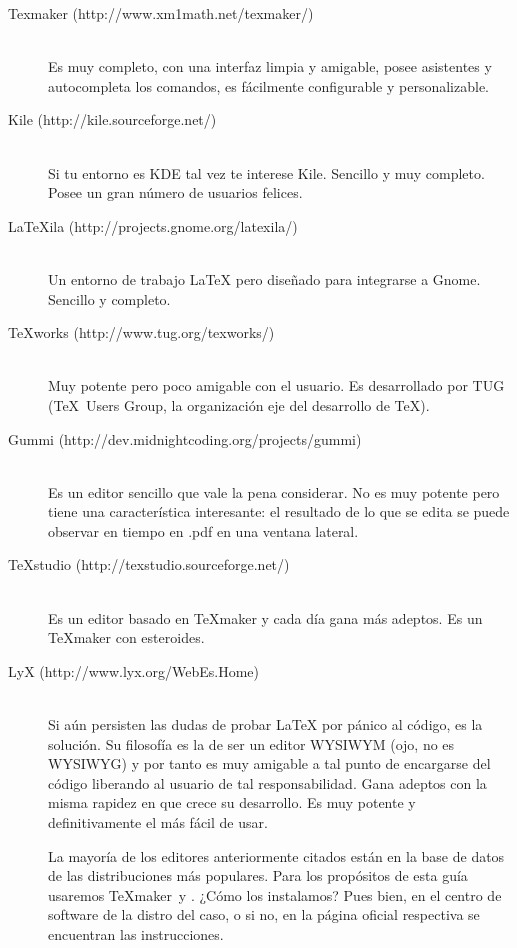 		\begin{description}
			\item[Texmaker (http://www.xm1math.net/texmaker/)] \hfill \\
			Es muy completo, con una interfaz limpia y amigable, posee asistentes y autocompleta los comandos, es fácilmente configurable y personalizable.
			\item[Kile (http://kile.sourceforge.net/)] \hfill \\
			Si tu entorno es KDE tal vez te interese Kile. Sencillo y muy completo. Posee un gran número de usuarios felices.
			\item[LaTeXila (http://projects.gnome.org/latexila/)] \hfill \\
			Un entorno de trabajo LaTeX pero diseñado para integrarse a Gnome. Sencillo y completo.
			\item[TeXworks (http://www.tug.org/texworks/)] \hfill \\
			Muy potente pero poco amigable con el usuario. Es desarrollado por TUG (\TeX\ Users Group, la organización eje del desarrollo de \TeX).
			\item[Gummi (http://dev.midnightcoding.org/projects/gummi)] \hfill \\
			Es un editor sencillo que vale la pena considerar. No es muy potente pero tiene una característica interesante: el resultado de lo que se edita se puede observar en tiempo en .pdf en una ventana lateral.
			\item[TeXstudio (http://texstudio.sourceforge.net/)] \hfill \\
			Es un editor basado en TeXmaker y cada día gana más adeptos. Es un TeXmaker con esteroides.
			\item[LyX (http://www.lyx.org/WebEs.Home)] \hfill \\
			Si aún persisten las dudas de probar LaTeX por pánico al código, \LyX es la solución. Su filosofía es la de ser un editor WYSIWYM (ojo, no es WYSIWYG) y por tanto es muy amigable a tal punto de encargarse del código liberando al usuario de tal responsabilidad. Gana adeptos con la misma rapidez en que crece su desarrollo. Es muy potente y definitivamente el más fácil de usar.
			
			La mayoría de los editores anteriormente citados están en la base de datos de las distribuciones más populares.
			Para los propósitos de esta guía usaremos \TeX maker\ y \LyX.
			¿Cómo los instalamos? Pues bien, en el centro de software de la distro del caso, o si no, en la página oficial respectiva se encuentran las instrucciones.
		\end{description}
		

